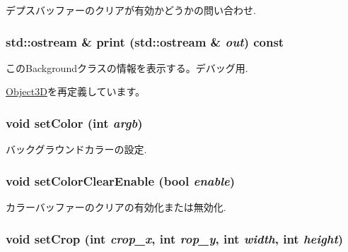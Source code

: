 デプスバッファーのクリアが有効かどうかの問い合わせ. \hypertarget{classm3g_1_1Background_6fea17fa1532df3794f8cb39cb4f911f}{
\subsubsection[{print}]{\setlength{\rightskip}{0pt plus 5cm}std::ostream \& print (std::ostream \& {\em out}) const}}
\label{classm3g_1_1Background_6fea17fa1532df3794f8cb39cb4f911f}


このBackgroundクラスの情報を表示する。デバッグ用. 

\hyperlink{classm3g_1_1Object3D_6fea17fa1532df3794f8cb39cb4f911f}{Object3D}を再定義しています。\hypertarget{classm3g_1_1Background_38439e862c59a31b90e57c18669061ae}{
\subsubsection[{setColor}]{\setlength{\rightskip}{0pt plus 5cm}void setColor (int {\em argb})}}
\label{classm3g_1_1Background_38439e862c59a31b90e57c18669061ae}


バックグラウンドカラーの設定. \hypertarget{classm3g_1_1Background_68e4fe4cf32fe60f166056115081aa65}{
\subsubsection[{setColorClearEnable}]{\setlength{\rightskip}{0pt plus 5cm}void setColorClearEnable (bool {\em enable})}}
\label{classm3g_1_1Background_68e4fe4cf32fe60f166056115081aa65}


カラーバッファーのクリアの有効化または無効化. \hypertarget{classm3g_1_1Background_e543ac6196bbe65a7af8e6b8686441a7}{
\subsubsection[{setCrop}]{\setlength{\rightskip}{0pt plus 5cm}void setCrop (int {\em crop\_\-x}, \/  int {\em rop\_\-y}, \/  int {\em width}, \/  int {\em height})}}
\label{classm3g_1_1Background_e543ac6196bbe65a7af8e6b8686441a7}


